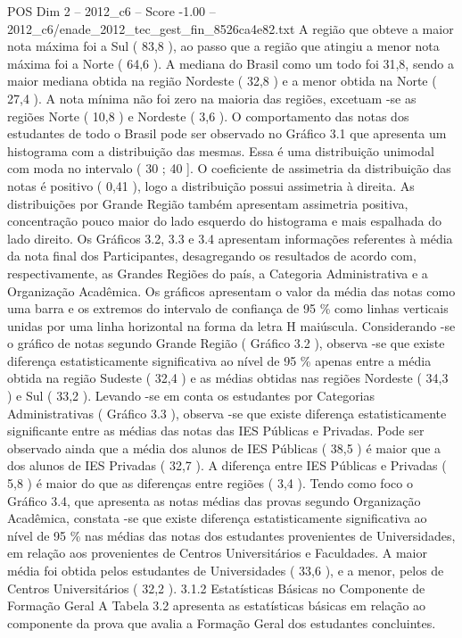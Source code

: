 \begin{textsample}{POS Dim 2 – 2012\_c6 – Score -1.00 – 2012\_c6/enade\_2012\_tec\_gest\_fin\_8526ca4e82.txt}
A região que obteve a maior nota máxima foi a Sul ( 83,8 ), ao passo que a região que atingiu a menor nota máxima foi a Norte ( 64,6 ).
A mediana do Brasil como um todo foi 31,8, sendo a maior mediana obtida na região Nordeste ( 32,8 ) e a menor obtida na Norte ( 27,4 ).
A nota mínima não foi zero na maioria das regiões, excetuam -se as regiões Norte ( 10,8 ) e Nordeste ( 3,6 ).
O comportamento das notas dos estudantes de todo o Brasil pode ser observado no Gráfico 3.1 que apresenta um histograma com a distribuição das mesmas.
Essa é uma distribuição unimodal com moda no intervalo ( 30 ; 40 ].
O coeficiente de assimetria da distribuição das notas é positivo ( 0,41 ), logo a distribuição possui assimetria à direita.
As distribuições por Grande Região também apresentam assimetria positiva, concentração pouco maior do lado esquerdo do histograma e mais espalhada do lado direito.
Os Gráficos 3.2, 3.3 e 3.4 apresentam informações referentes à média da nota final dos Participantes, desagregando os resultados de acordo com, respectivamente, as Grandes Regiões do país, a Categoria Administrativa e a Organização Acadêmica.
Os gráficos apresentam o valor da média das notas como uma barra e os extremos do intervalo de confiança de 95 \% como linhas verticais unidas por uma linha horizontal na forma da letra H maiúscula.
Considerando -se o gráfico de notas segundo Grande Região ( Gráfico 3.2 ), observa -se que existe diferença estatisticamente significativa ao nível de 95 \% apenas entre a média obtida na região Sudeste ( 32,4 ) e as médias obtidas nas regiões Nordeste ( 34,3 ) e Sul ( 33,2 ).
Levando -se em conta os estudantes por Categorias Administrativas ( Gráfico 3.3 ), observa -se que existe diferença estatisticamente significante entre as médias das notas das IES Públicas e Privadas.
Pode ser observado ainda que a média dos alunos de IES Públicas ( 38,5 ) é maior que a dos alunos de IES Privadas ( 32,7 ).
A diferença entre IES Públicas e Privadas ( 5,8 ) é maior do que as diferenças entre regiões ( 3,4 ).
Tendo como foco o Gráfico 3.4, que apresenta as notas médias das provas segundo Organização Acadêmica, constata -se que existe diferença estatisticamente significativa ao nível de 95 \% nas médias das notas dos estudantes provenientes de Universidades, em relação aos provenientes de Centros Universitários e Faculdades.
A maior média foi obtida pelos estudantes de Universidades ( 33,6 ), e a menor, pelos de Centros Universitários ( 32,2 ). 3.1.2 Estatísticas Básicas no Componente de Formação Geral A Tabela 3.2 apresenta as estatísticas básicas em relação ao componente da prova que avalia a Formação Geral dos estudantes concluintes.

\end{textsample}
